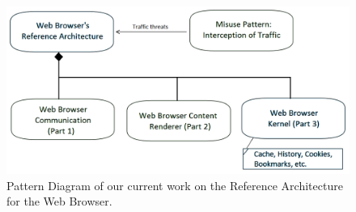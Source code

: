 \documentclass[prodmode,hillsideplop]{acmlarge}
\begin{document}
\begin{figure}[h!t]
  \centering
  \includegraphics[scale=0.3]{imgs/relations-finish.png}
  \caption{Pattern Diagram of our current work on the Reference Architecture for the Web Browser.}
  \label{fig:pattDiag}
\end{figure}
\vspace*{-0.3cm}
\end{document}
